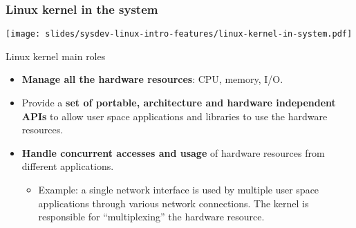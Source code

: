 
\begin{frame}
  \frametitle{Linux kernel in the system}
  \begin{center}
    \texttt{[image: slides/sysdev-linux-intro-features/linux-kernel-in-system.pdf]}
  \end{center}
\end{frame}

\begin{frame}{Linux kernel main roles}
  \begin{itemize}
  \item {\bf Manage all the hardware resources}: CPU, memory, I/O.
  \item Provide a {\bf set of portable, architecture and hardware
      independent APIs} to allow user space applications and libraries
    to use the hardware resources.
  \item {\bf Handle concurrent accesses and usage} of hardware
    resources from different applications.
    \begin{itemize}
    \item Example: a single network interface is used by multiple
      user space applications through various network connections. The
      kernel is responsible for ``multiplexing'' the hardware resource.
    \end{itemize}
  \end{itemize}
\end{frame}

